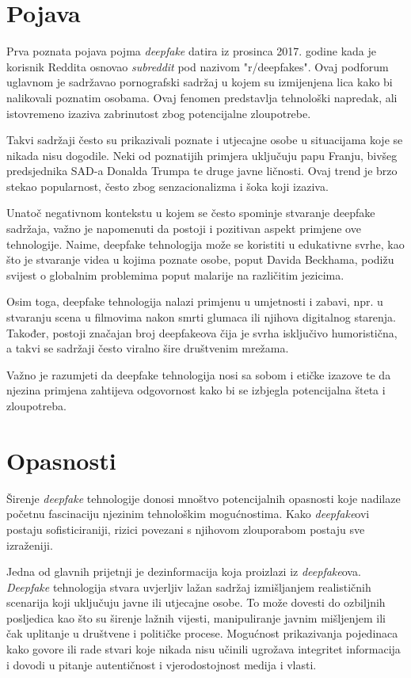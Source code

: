 \documentclass[seminarski, times, utf8]{fer}
\begin{document}
\section{Pojava}

Prva poznata pojava pojma \textit{deepfake} datira iz prosinca 2017. godine kada je korisnik Reddita osnovao \textit{subreddit} pod nazivom "r/deepfakes".%
Ovaj podforum uglavnom je sadržavao pornografski sadržaj u kojem su izmijenjena lica kako bi nalikovali poznatim osobama. Ovaj fenomen predstavlja tehnološki napredak, ali istovremeno izaziva zabrinutost zbog potencijalne zloupotrebe.

Takvi sadržaji često su prikazivali poznate i utjecajne osobe u situacijama koje se nikada nisu dogodile. Neki od poznatijih primjera uključuju papu Franju, bivšeg predsjednika SAD-a Donalda Trumpa te druge javne ličnosti. Ovaj trend je brzo stekao popularnost, često zbog senzacionalizma i šoka koji izaziva.

Unatoč negativnom kontekstu u kojem se često spominje stvaranje deepfake sadržaja, važno je napomenuti da postoji i pozitivan aspekt primjene ove tehnologije. Naime, deepfake tehnologija može se koristiti u edukativne svrhe, kao što je stvaranje videa u kojima poznate osobe, poput Davida Beckhama, podižu svijest o globalnim problemima poput malarije na različitim jezicima.

Osim toga, deepfake tehnologija nalazi primjenu u umjetnosti i zabavi, npr. u stvaranju scena u filmovima nakon smrti glumaca ili njihova digitalnog starenja. Također, postoji značajan broj deepfakeova čija je svrha isključivo humoristična, a takvi se sadržaji često viralno šire društvenim mrežama.

Važno je razumjeti da deepfake tehnologija nosi sa sobom i etičke izazove te da njezina primjena zahtijeva odgovornost kako bi se izbjegla potencijalna šteta i zloupotreba.
\section{Opasnosti}

Širenje \textit{deepfake} tehnologije donosi mnoštvo potencijalnih opasnosti koje nadilaze početnu fascinaciju njezinim tehnološkim mogućnostima. Kako \textit{deepfake}ovi postaju sofisticiraniji, rizici povezani s njihovom zlouporabom postaju sve izraženiji. 

Jedna od glavnih prijetnji je dezinformacija koja proizlazi iz \textit{deepfake}ova. \textit{Deepfake} tehnologija stvara uvjerljiv lažan sadržaj izmišljanjem realističnih scenarija koji uključuju javne ili utjecajne osobe. To može dovesti do ozbiljnih posljedica kao što su širenje lažnih vijesti, manipuliranje javnim mišljenjem ili čak uplitanje u društvene i političke procese. Mogućnost prikazivanja pojedinaca kako govore ili rade stvari koje nikada nisu učinili ugrožava integritet informacija i dovodi u pitanje autentičnost i vjerodostojnost medija i vlasti.
\end{document}
